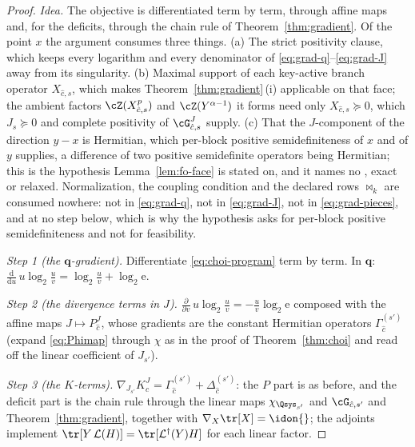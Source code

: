 \begin{proof}
\emph{Idea.} The objective is differentiated term by term, through affine
maps and, for the deficits, through the chain rule of
Theorem~\ref{thm:gradient}. Of the point $x$ the argument consumes three
things. (a) The strict positivity clause, which keeps every logarithm and
every denominator of \eqref{eq:grad-q}--\eqref{eq:grad-J} away from its
singularity. (b) Maximal support of each key-active branch operator
$X_{\hat c,s}$, which makes Theorem~\ref{thm:gradient}\,(i) applicable on
that face; the ambient factors $\cZ(X^{p}_{\hat c,s})$ and
$\cZ(Y^{\alpha-1})$ it forms need only $X_{\hat c,s}\succeq0$, which
$J_s\succeq0$ and complete positivity of $\cG^{J}_{\hat c,s}$ supply.
(c) That the $J$-component of the direction $y-x$ is Hermitian, which
per-block positive semidefiniteness of $x$ and of $y$ supplies, a
difference of two positive semidefinite operators being Hermitian; this
is the hypothesis Lemma~\ref{lem:fo-face} is stated on, and it names no
, exact or relaxed. Normalization, the coupling condition and the declared rows
$\bowtie_k$ are consumed nowhere: not in \eqref{eq:grad-q}, not in
\eqref{eq:grad-J}, not in \eqref{eq:grad-pieces}, and at no step below,
which is why the hypothesis asks for per-block positive semidefiniteness
and not for feasibility.

\emph{Step 1 (the $\mathbf q$-gradient).} Differentiate
\eqref{eq:choi-program} term by term. In $\mathbf q$:
$\frac{\mathrm d}{\mathrm du}\,u\log_2\frac uv
=\log_2\frac uv+\log_2\mathrm e$.

\emph{Step 2 (the divergence terms in $J$).}
$\frac{\partial}{\partial v}\,u\log_2\frac uv=-\frac{u}{v}\log_2\mathrm
e$ composed with the affine maps $J\mapsto P^{J}_{\hat c}$, whose
gradients are the constant Hermitian operators
$\Gamma^{(s')}_{\hat c}$ (expand \eqref{eq:Phimap} through
$\chi$ as in the proof of Theorem~\ref{thm:choi} and read off the linear
coefficient of $J_{s'}$).

\emph{Step 3 (the $K$-terms).}
$\nabla_{J_{s'}}K^{J}_{\hat c}
=\Gamma^{(s')}_{\hat c}+\Delta^{(s')}_{\hat c}$: the $P$ part is as
before, and the deficit part is the chain rule through the linear maps
$\chi_{\Qsys_{s'}}$ and $\cG_{\hat c,s'}$ and
Theorem~\ref{thm:gradient}, together with
$\nabla_{X}\tr[X]=\idon{}$; the adjoints implement
$\tr[Y\,\mathcal L(H)]=\tr[\mathcal L^{\dagger}(Y)H]$ for each linear
factor.


\end{proof}
